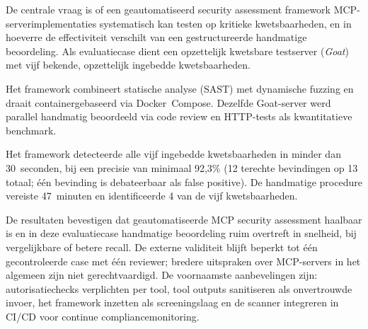 De centrale vraag is of een geautomatiseerd security assessment framework MCP-server\-implementaties systematisch kan testen op kritieke kwetsbaarheden, en in hoeverre de effectiviteit verschilt van een gestructureerde handmatige beoordeling. Als evaluatiecase dient een opzettelijk kwetsbare testserver (\emph{Goat}) met vijf bekende, opzettelijk ingebedde kwetsbaarheden.

Het framework combineert statische analyse (SAST) met dynamische fuzzing en draait containergebaseerd via Docker~Compose. Dezelfde Goat-server werd parallel handmatig beoordeeld via code review en HTTP-tests als kwantitatieve benchmark.

Het framework detecteerde alle vijf ingebedde kwetsbaarheden in minder dan 30~seconden, bij een precisie van minimaal 92{,}3\% (12 terechte bevindingen op 13 totaal; één bevinding is debateerbaar als false positive). De handmatige procedure vereiste 47~minuten en identificeerde 4 van de vijf kwetsbaarheden.

De resultaten bevestigen dat geautomatiseerde MCP security assessment haalbaar is en in deze evaluatiecase handmatige beoordeling ruim overtreft in snelheid, bij vergelijkbare of betere recall. De externe validiteit blijft beperkt tot één gecontroleerde case met één reviewer; bredere uitspraken over MCP-servers in het algemeen zijn niet gerechtvaardigd. De voornaamste aanbevelingen zijn: autorisatiechecks verplichten per tool, tool outputs sanitiseren als onvertrouwde invoer, het framework inzetten als screeningslaag en de scanner integreren in CI/CD voor continue compliancemonitoring.
